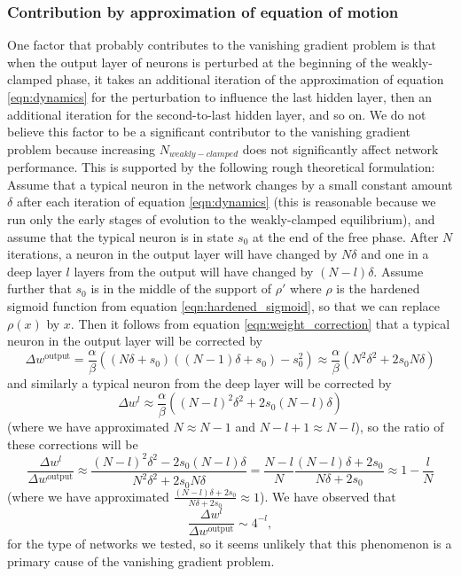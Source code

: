 \documentclass[format=sigconf]{acmart}
\newcommand{\npar}{\\\indent}
\begin{document}
\subsubsection{Contribution by approximation of equation of motion}

One factor that probably contributes to the vanishing gradient problem is that when the output layer of neurons is perturbed at the beginning of the weakly-clamped phase, it takes an additional iteration of the approximation of equation \ref{eqn:dynamics} for the perturbation to influence the last hidden layer, then an additional iteration for the second-to-last hidden layer, and so on. We do not believe this factor to be a significant contributor to the vanishing gradient problem because increasing $N_{weakly-clamped}$ does not significantly affect network performance. This is supported by the following rough theoretical formulation:
\npar
Assume that a typical neuron in the network changes by a small constant amount $\delta$ after each iteration of equation \ref{eqn:dynamics} (this is reasonable because we run only the early stages of evolution to the weakly-clamped equilibrium), and assume that the typical neuron is in state $s_0$ at the end of the free phase. After $N$ iterations, a neuron in the output layer will have changed by $N\delta$ and one in a deep layer $l$ layers from the output will have changed by $(N-l)\delta$. Assume further that $s_0$ is in the middle of the support of $\rho'$ where $\rho$ is the hardened sigmoid function from equation \ref{eqn:hardened_sigmoid}, so that we can replace $\rho(x)$ by $x$. Then it follows from equation \ref{eqn:weight_correction} that a typical neuron in the output layer will be corrected by 
\begin{equation}
\Delta w^\text{output}=\frac{\alpha}{\beta}((N\delta + s_0)((N-1)\delta + s_0)-s_0^2)\approx \frac{\alpha}{\beta}(N^2\delta^2+2s_0N\delta)
\end{equation}
and similarly a typical neuron from the deep layer will be corrected by 
\begin{equation}
\Delta w^l\approx \frac{\alpha}{\beta}((N-l)^2\delta^2+2s_0(N-l)\delta)
\end{equation}
(where we have approximated $N\approx N-1$ and $N-l+1\approx N-l$), so the ratio of these corrections will be
\begin{equation}
\frac{\Delta w^l}{\Delta w^{\text{output}}}\approx \frac{(N-l)^2\delta^2-2s_0(N-l)\delta}{N^2\delta^2+2s_0N\delta}=\frac{N-l}{N}\frac{(N-l)\delta+2s_0}{N\delta+2s_0}\approx 1-\frac{l}{N}
\end{equation}
(where we have approximated $\frac{(N-l)\delta +2s_0}{N\delta+2s_0}\approx 1$). We have observed that
\begin{equation}
\frac{\Delta w^l}{\Delta w^{\text{output}}}\sim 4^{-l},
\end{equation}
for the type of networks we tested, so it seems unlikely that this phenomenon is a primary cause of the vanishing gradient problem.
\end{document}

